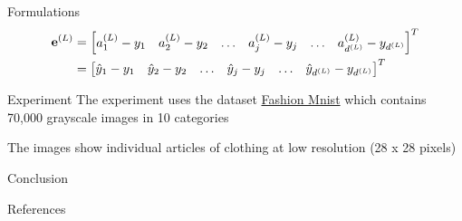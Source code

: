\documentclass[10pt]{beamer}
\theoremstyle{remark}
\theoremstyle{definition}
\begin{document}
\begin{frame}[allowframebreaks]{Formulations}
	\begin{equation}
		\begin{aligned}
			\bold{e}^{(L)}&=\begin{bmatrix} a_1^{(L)} - y_1 & a_2^{(L)} - y_2 & \dots & a_j^{(L)} - y_j & \dots & a_{d^{(L)}}^{(L)} - y_{d^{(L)}} \end{bmatrix}^T\\&=\begin{bmatrix} \hat{y}_1 - y_1 & \hat{y}_2 - y_2 & \dots & \hat{y}_j - y_j & \dots & \hat{y}_{d^{(L)}} - y_{d^{(L)}} \end{bmatrix}^T
		\end{aligned}
	\end{equation}

\end{frame}

\begin{frame}[allowframebreaks]{Experiment}
	The experiment uses the dataset \href{https://github.com/zalandoresearch/fashion-mnist}{Fashion Mnist} which contains 70,000 grayscale images in 10 categories

	The images show individual articles of clothing at low resolution (28 x 28 pixels)
\end{frame}

\begin{frame}[allowframebreaks]{Conclusion}
\end{frame}

\begin{frame}[allowframebreaks]{References}
\printbibliography
\end{frame}
\end{document}
